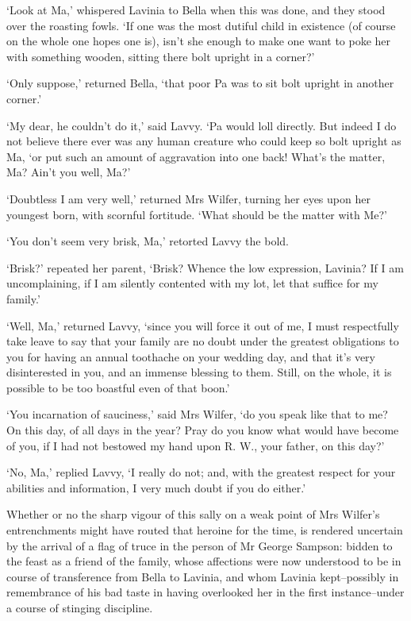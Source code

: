 ‘Look at Ma,’ whispered Lavinia to Bella when this was done, and they
stood over the roasting fowls. ‘If one was the most dutiful child in
existence (of course on the whole one hopes one is), isn’t she enough
to make one want to poke her with something wooden, sitting there bolt
upright in a corner?’

‘Only suppose,’ returned Bella, ‘that poor Pa was to sit bolt upright in
another corner.’

‘My dear, he couldn’t do it,’ said Lavvy. ‘Pa would loll directly. But
indeed I do not believe there ever was any human creature who could keep
so bolt upright as Ma, ‘or put such an amount of aggravation into one
back! What’s the matter, Ma? Ain’t you well, Ma?’

‘Doubtless I am very well,’ returned Mrs Wilfer, turning her eyes upon
her youngest born, with scornful fortitude. ‘What should be the matter
with Me?’

‘You don’t seem very brisk, Ma,’ retorted Lavvy the bold.

‘Brisk?’ repeated her parent, ‘Brisk? Whence the low expression,
Lavinia? If I am uncomplaining, if I am silently contented with my lot,
let that suffice for my family.’

‘Well, Ma,’ returned Lavvy, ‘since you will force it out of me, I must
respectfully take leave to say that your family are no doubt under
the greatest obligations to you for having an annual toothache on your
wedding day, and that it’s very disinterested in you, and an immense
blessing to them. Still, on the whole, it is possible to be too boastful
even of that boon.’

‘You incarnation of sauciness,’ said Mrs Wilfer, ‘do you speak like that
to me? On this day, of all days in the year? Pray do you know what
would have become of you, if I had not bestowed my hand upon R. W., your
father, on this day?’

‘No, Ma,’ replied Lavvy, ‘I really do not; and, with the greatest
respect for your abilities and information, I very much doubt if you do
either.’

Whether or no the sharp vigour of this sally on a weak point of Mrs
Wilfer’s entrenchments might have routed that heroine for the time, is
rendered uncertain by the arrival of a flag of truce in the person of
Mr George Sampson: bidden to the feast as a friend of the family, whose
affections were now understood to be in course of transference from
Bella to Lavinia, and whom Lavinia kept--possibly in remembrance of his
bad taste in having overlooked her in the first instance--under a course
of stinging discipline.

